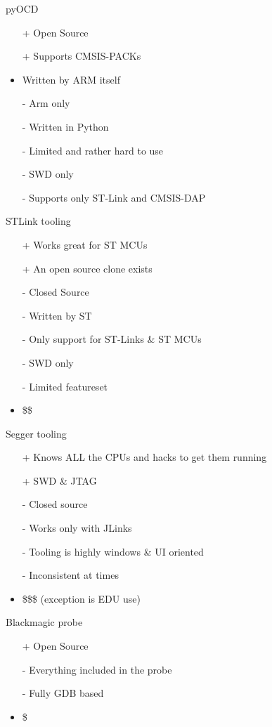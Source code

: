 \documentclass[aspectratio=1610,14pt,t]{beamer}
\begin{document}
\begin{frame}[c]{pyOCD}
  \begin{itemize}
    \item[+] Open Source
    \item[+] Supports CMSIS-PACKs 
    \item Written by ARM itself
    \item[-] Arm only
    \item[-] Written in Python
    \item[-] Limited and rather hard to use
    \item[-] SWD only
    \item[-] Supports only ST-Link and CMSIS-DAP   
  \end{itemize}
\end{frame}

\begin{frame}[c]{STLink tooling}
  \begin{itemize}
    \item[+] Works great for ST MCUs
    \item[+] An open source clone exists 
    \item[-] Closed Source
    \item[-] Written by ST
    \item[-] Only support for ST-Links \& ST MCUs
    \item[-] SWD only
    \item[-] Limited featureset
    \item \$\$ 
  \end{itemize}
\end{frame}

\begin{frame}[c]{Segger tooling}
  \begin{itemize}
    \item[+] Knows ALL the CPUs and hacks to get them running
    \item[+] SWD \& JTAG 
    \item[-] Closed source
    \item[-] Works only with JLinks 
    \item[-] Tooling is highly windows \& UI oriented
    \item[-] Inconsistent at times 
    \item \$\$\$ (exception is EDU use)
  \end{itemize}
\end{frame}

\begin{frame}[c]{Blackmagic probe}
  \begin{itemize}
    \item[+] Open Source 
    \item[-] Everything included in the probe
    \item[-] Fully GDB based
    \item \$
  \end{itemize}
\end{frame}
\end{document}
